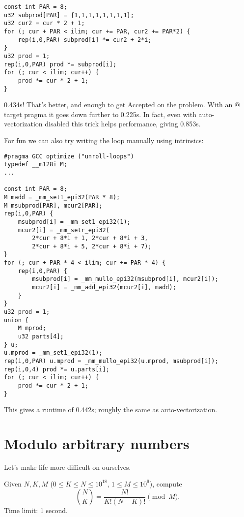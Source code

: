 \documentclass[openany]{book}
\begin{document}
\begin{lstlisting}
const int PAR = 8;
u32 subprod[PAR] = {1,1,1,1,1,1,1,1};
u32 cur2 = cur * 2 + 1;
for (; cur + PAR < ilim; cur += PAR, cur2 += PAR*2) {
	rep(i,0,PAR) subprod[i] *= cur2 + 2*i;
}
u32 prod = 1;
rep(i,0,PAR) prod *= subprod[i];
for (; cur < ilim; cur++) {
	prod *= cur * 2 + 1;
}
\end{lstlisting}

0.434s! That's better, and enough to get Accepted on the problem. With an @ target pragma it goes down further to 0.225s. In fact, even with auto-vectorization disabled this trick helps performance, giving 0.853s.

For fun we can also try writing the loop manually using intrinsics:
\begin{lstlisting}
#pragma GCC optimize ("unroll-loops")
typedef __m128i M;
...

const int PAR = 8;
M madd = _mm_set1_epi32(PAR * 8);
M msubprod[PAR], mcur2[PAR];
rep(i,0,PAR) {
	msubprod[i] = _mm_set1_epi32(1);
	mcur2[i] = _mm_setr_epi32(
	    2*cur + 8*i + 1, 2*cur + 8*i + 3,
	    2*cur + 8*i + 5, 2*cur + 8*i + 7);
}
for (; cur + PAR * 4 < ilim; cur += PAR * 4) {
	rep(i,0,PAR) {
		msubprod[i] = _mm_mullo_epi32(msubprod[i], mcur2[i]);
		mcur2[i] = _mm_add_epi32(mcur2[i], madd);
	}
}
u32 prod = 1;
union {
	M mprod;
	u32 parts[4];
} u;
u.mprod = _mm_set1_epi32(1);
rep(i,0,PAR) u.mprod = _mm_mullo_epi32(u.mprod, msubprod[i]);
rep(i,0,4) prod *= u.parts[i];
for (; cur < ilim; cur++) {
	prod *= cur * 2 + 1;
}
\end{lstlisting}

This gives a runtime of 0.442s; roughly the same as auto-vectorization.

\section{Modulo arbitrary numbers}

Let's make life more difficult on ourselves.

\begin{framed}
\noindent
Given $N, K, M$ ($0 \le K \le N \le 10^{18}$, $1 \le M \le 10^9$), compute
\[
\binom N K = \frac{N!}{K!(N-K)!} \pmod {M}.
\]
Time limit: 1 second.
\end{framed}
\end{document}
